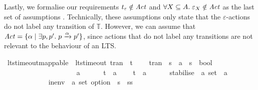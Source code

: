 \begin{isabellebody}
\begin{isamarkuptext}
Lastly, we formalise our requirements $t_\varepsilon \notin \mathit{Act}$ and $\forall X \subseteq A.\; \varepsilon_X \notin \mathit{Act}$ as the last set of assumptions . Technically, these assumptions only state that the $\varepsilon$-actions do not label any transition of $\mathbb{T}$. However, we can assume that 
$\mathit{Act} = \{ \alpha \mid \exists p, p'.\; p \xrightarrow{\alpha} p' \}$, 
since actions that do not label any transitions are not relevant to the behaviour of an LTS.%
\end{isamarkuptext}\isamarkuptrue%
\isamarkupfalse%
\ lts{\isacharunderscore}{\kern0pt}timeout{\isacharunderscore}{\kern0pt}mappable\ {\isacharequal}{\kern0pt}\ lts{\isacharunderscore}{\kern0pt}timeout\ tran\ {\isasymtau}\ t\ \isanewline
\ \ \ tran\ {\isacharcolon}{\kern0pt}{\isacharcolon}{\kern0pt}\ {\isachardoublequoteopen}{\isacharprime}{\kern0pt}s\ {\isasymRightarrow}\ {\isacharprime}{\kern0pt}a\ {\isasymRightarrow}\ {\isacharprime}{\kern0pt}s\ {\isasymRightarrow}\ bool{\isachardoublequoteclose}\ \isanewline
\ \ \ \ \ \ {\isacharparenleft}{\kern0pt}{\isachardoublequoteopen}{\isacharunderscore}{\kern0pt}\ {\isasymlongmapsto}{\isacharunderscore}{\kern0pt}\ {\isacharunderscore}{\kern0pt}{\isachardoublequoteclose}\ {\isacharbrackleft}{\kern0pt}{}{}{\isacharcomma}{\kern0pt}\ {}{}{\isacharcomma}{\kern0pt}\ {}{}{\isacharbrackright}{\kern0pt}\ {}{}{\isacharparenright}{\kern0pt}\ \isanewline
\ \ \ \ \ {\isasymtau}\ {\isacharcolon}{\kern0pt}{\isacharcolon}{\kern0pt}\ {\isacharprime}{\kern0pt}a\ \isanewline
\ \ \ \ \ t\ {\isacharcolon}{\kern0pt}{\isacharcolon}{\kern0pt}\ {\isacharprime}{\kern0pt}a\ {\isacharplus}{\kern0pt}\isanewline
\ \ \ t{\isacharunderscore}{\kern0pt}{\isasymepsilon}\ {\isacharcolon}{\kern0pt}{\isacharcolon}{\kern0pt}\ {\isacharprime}{\kern0pt}a\ \isanewline
\ \ \ \ \ stabilise\ {\isacharcolon}{\kern0pt}{\isacharcolon}{\kern0pt}\ {\isacartoucheopen}{\isacharprime}{\kern0pt}a\ set\ {\isasymRightarrow}\ {\isacharprime}{\kern0pt}a{\isacartoucheclose}\ \isanewline
\ \ \ \ \ \ {\isacharparenleft}{\kern0pt}{\isacartoucheopen}{\isasymepsilon}{\isacharbrackleft}{\kern0pt}{\isacharunderscore}{\kern0pt}{\isacharbrackright}{\kern0pt}{\isacartoucheclose}{\isacharparenright}{\kern0pt}\ \isanewline
\ \ \ \ \ in{\isacharunderscore}{\kern0pt}env\ {\isacharcolon}{\kern0pt}{\isacharcolon}{\kern0pt}\ {\isacartoucheopen}{\isacharprime}{\kern0pt}a\ set\ option\ {\isasymRightarrow}\ {\isacharprime}{\kern0pt}s\ {\isasymRightarrow}\ {\isacharprime}{\kern0pt}ss{\isacartoucheclose}\ \isanewline

\end{isabellebody}
